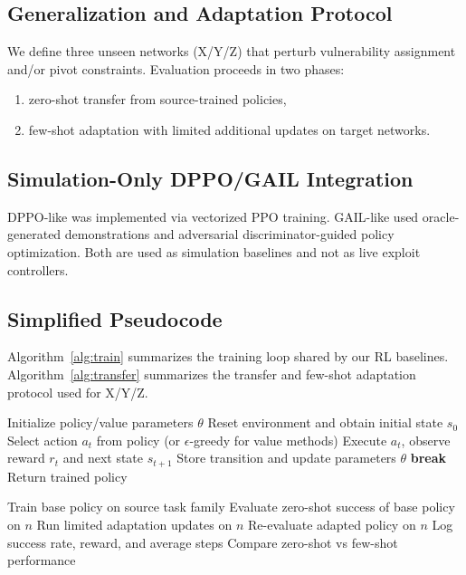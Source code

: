 \documentclass[conference]{IEEEtran}
\begin{document}
\subsection{Generalization and Adaptation Protocol}
We define three unseen networks (X/Y/Z) that perturb vulnerability assignment and/or pivot constraints. Evaluation proceeds in two phases:
\begin{enumerate}
    \item zero-shot transfer from source-trained policies,
    \item few-shot adaptation with limited additional updates on target networks.
\end{enumerate}

\subsection{Simulation-Only DPPO/GAIL Integration}
DPPO-like was implemented via vectorized PPO training. GAIL-like used oracle-generated demonstrations and adversarial discriminator-guided policy optimization. Both are used as simulation baselines and not as live exploit controllers.

\subsection{Simplified Pseudocode}
Algorithm~\ref{alg:train} summarizes the training loop shared by our RL baselines. Algorithm~\ref{alg:transfer} summarizes the transfer and few-shot adaptation protocol used for X/Y/Z.

\begin{algorithm}[t]
\caption{Simulation RL Training (Simplified)}
\label{alg:train}
\begin{algorithmic}[1]
\State Initialize policy/value parameters $\theta$
    \State Reset environment and obtain initial state $s_0$
        \State Select action $a_t$ from policy (or $\epsilon$-greedy for value methods)
        \State Execute $a_t$, observe reward $r_t$ and next state $s_{t+1}$
        \State Store transition and update parameters $\theta$
            \State \textbf{break}
        \EndIf
    \EndFor
\EndFor
\State Return trained policy
\end{algorithmic}
\end{algorithm}

\begin{algorithm}[t]
\caption{Transfer + Few-Shot Adaptation (Simplified)}
\label{alg:transfer}
\begin{algorithmic}[1]
\State Train base policy on source task family
    \State Evaluate zero-shot success of base policy on $n$
    \State Run limited adaptation updates on $n$
    \State Re-evaluate adapted policy on $n$
    \State Log success rate, reward, and average steps
\EndFor
\State Compare zero-shot vs few-shot performance
\end{algorithmic}
\end{algorithm}
\end{document}
